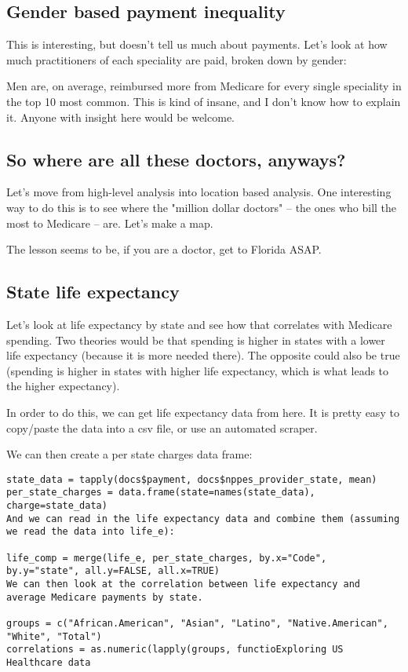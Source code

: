 \subsection*{Gender based payment inequality}
This is interesting, but doesn't tell us much about payments. Let's look at how much practitioners of each speciality are paid, broken down by gender:

Men are, on average, reimbursed more from Medicare for every single speciality in the top 10 most common. This is kind of insane, and I don't know how to explain it. Anyone with insight here would be welcome.

\subsection*{So where are all these doctors, anyways?}
Let's move from high-level analysis into location based analysis. One interesting way to do this is to see where the "million dollar doctors" -- the ones who bill the most to Medicare -- are. Let's make a map.

The lesson seems to be, if you are a doctor, get to Florida ASAP.

\subsection*{State life expectancy}
Let's look at life expectancy by state and see how that correlates with Medicare spending. Two theories would be that spending is higher in states with a lower life expectancy (because it is more needed there). The opposite could also be true (spending is higher in states with higher life expectancy, which is what leads to the higher expectancy).

In order to do this, we can get life expectancy data from here. It is pretty easy to copy/paste the data into a csv file, or use an automated scraper.

We can then create a per state charges data frame:

\begin{framed}
\begin{verbatim}
state_data = tapply(docs$payment, docs$nppes_provider_state, mean)
per_state_charges = data.frame(state=names(state_data), charge=state_data)
And we can read in the life expectancy data and combine them (assuming we read the data into life_e):

life_comp = merge(life_e, per_state_charges, by.x="Code", by.y="state", all.y=FALSE, all.x=TRUE)
We can then look at the correlation between life expectancy and average Medicare payments by state.

groups = c("African.American", "Asian", "Latino", "Native.American", "White", "Total")
correlations = as.numeric(lapply(groups, functioExploring US Healthcare data

\end{verbatim}
\end{framed}

